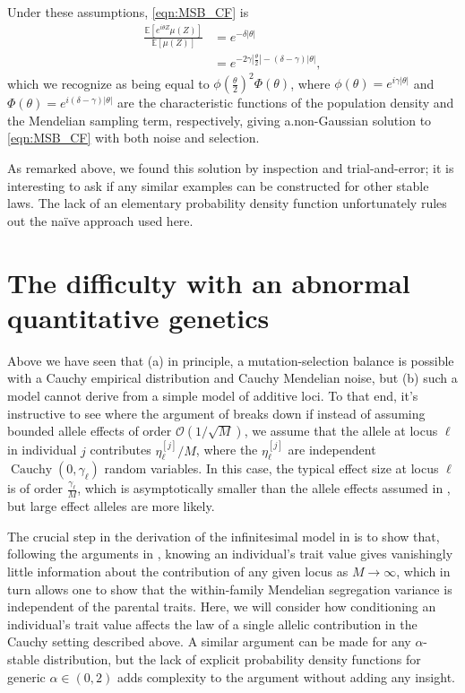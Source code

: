 \documentclass{article}
\newcommand{\1}{\mathbbm{1}}
\newcommand{\Oh}{{\mathcal O}}
\DeclareMathOperator*{\Cauchy}{Cauchy}
\theoremstyle{remark}
\theoremstyle{definition}
\begin{document}
Under these assumptions, \eqref{eqn:MSB_CF} is
\begin{align*}
	\frac{\mathbb{E}\left[e^{i \theta Z}\mu(Z)\right]}{\mathbb{E}[\mu(Z)]} 
	&= e^{-\delta |\theta|}\\
	&= e^{-2\gamma \left|\frac{\theta}{2}\right|-(\delta-\gamma)|\theta|},
\end{align*} 
which we recognize as being equal to $\phi\left(\frac{\theta}{2}\right)^{2} \Phi(\theta)$, where $\phi(\theta) = e^{i\gamma|\theta|}$ and $\Phi(\theta) = e^{i(\delta - \gamma)|\theta|}$ are the characteristic functions of the population density and the Mendelian sampling term, respectively,
giving a.non-Gaussian solution to \eqref{eqn:MSB_CF} with both noise and selection.

As remarked above, we found this solution by inspection and trial-and-error; it is interesting to ask if any similar examples can be constructed for other stable laws.  The lack of an elementary probability density function unfortunately rules out the na\"ive approach used here. 


\section{The difficulty with an abnormal quantitative genetics}

Above we have seen that
(a) in principle,
a mutation-selection balance is possible with a Cauchy empirical distribution and Cauchy Mendelian noise,
but (b)
such a model cannot derive from a simple model of additive loci.
To that end, it's instructive to see where the argument of \cite{barton2017infinitesimal} breaks down
if instead of assuming bounded allele effects of order $\Oh(1/\sqrt{M})$,
we assume that the allele at locus $\ell$ in individual $j$ contributes
$\eta^{[j]}_{\ell}/M$, where the $\eta^{[j]}_{\ell}$ are independent $\Cauchy(0,\gamma_{\ell})$ random variables. 
In this case, the typical effect size at locus $\ell$ is of order $\frac{\gamma_{\ell}}{M}$,
which is asymptotically smaller than the allele effects assumed in \cite{barton2017infinitesimal},
but large effect alleles are more likely. 

The crucial step in the derivation of the infinitesimal model in \cite{barton2017infinitesimal} is to show that, following the arguments in \cite{Fisher1918}, knowing an individual's trait value gives vanishingly little information about the contribution of any given locus as $M \to \infty$, which in turn allows one to show that the within-family Mendelian segregation variance is independent of the parental traits. Here, we will consider how conditioning an individual's trait value affects the law of a single allelic contribution in the Cauchy setting described above. A similar argument can be made for any $\alpha$-stable distribution, but the lack of explicit probability density functions for generic $\alpha \in (0,2)$ adds complexity to the argument without adding any insight. 
\end{document}
